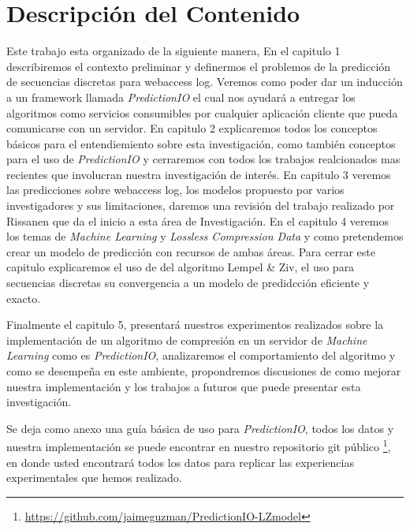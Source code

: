 \section{Descripción del Contenido}

Este trabajo esta organizado de la siguiente manera, En el capitulo 1 describiremos el contexto preliminar y definermos el problemos de la predicción de secuencias discretas para webaccess log. Veremos como poder dar un inducción a un framework llamada \emph{PredictionIO} el cual nos ayudará a entregar los algoritmos como servicios consumibles por cualquier aplicación cliente que pueda comunicarse con un servidor.
En capitulo 2 explicaremos todos los conceptos básicos para el entendiemiento sobre esta investigación, como también conceptos para el uso de \emph{PredictionIO} y cerraremos con todos los trabajos  realcionados mas recientes que involucran nuestra investigación de interés. En capitulo 3 veremos las predicciones sobre webaccess log, los modelos propuesto por varios investigadores y sus limitaciones, daremos una revisión del trabajo realizado por Rissanen\cite{Rissanen1984} que da el inicio a esta área de Investigación.
En el capitulo 4 veremos los temas de \emph{Machine Learning} y \emph{Lossless Compression Data} y como pretendemos crear un modelo de predicción con recursos de ambas áreas. Para cerrar este capitulo explicaremos el uso de del algoritmo Lempel \& Ziv, el uso para secuencias discretas su convergencia a un modelo de predidcción eficiente y exacto. 

Finalmente el capitulo 5, presentará nuestros experimentos realizados sobre la implementación de un algoritmo de compresión en un servidor de \emph{Machine Learning} como es \emph{PredictionIO}, analizaremos el comportamiento del algoritmo y como se desempeña en este ambiente, propondremos discusiones de como mejorar nuestra implementación y los trabajos a futuros que puede presentar esta investigación.

Se deja como anexo una guía básica de uso para \emph{PredictionIO}, todos los datos y nuestra implementación se puede encontrar en nuestro repositorio git público \footnote{\url{https://github.com/jaimeguzman/PredictionIO-LZmodel}}, en donde usted encontrará todos los datos para replicar las experiencias experimentales que hemos realizado. 


